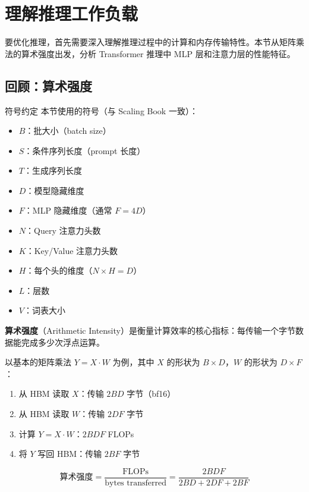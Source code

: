 \documentclass[a4paper]{article}
\begin{document}

\section{理解推理工作负载}

要优化推理，首先需要深入理解推理过程中的计算和内存传输特性。本节从矩阵乘法的算术强度出发，分析 Transformer 推理中 MLP 层和注意力层的性能特征。

\subsection{回顾：算术强度}

\begin{knowledgebox}{符号约定}
本节使用的符号（与 Scaling Book 一致）：
\begin{itemize}
    \item $B$：批大小（batch size）
    \item $S$：条件序列长度（prompt 长度）
    \item $T$：生成序列长度
    \item $D$：模型隐藏维度
    \item $F$：MLP 隐藏维度（通常 $F = 4D$）
    \item $N$：Query 注意力头数
    \item $K$：Key/Value 注意力头数
    \item $H$：每个头的维度（$N \times H = D$）
    \item $L$：层数
    \item $V$：词表大小
\end{itemize}
\end{knowledgebox}

\textbf{算术强度}（Arithmetic Intensity）是衡量计算效率的核心指标：每传输一个字节数据能完成多少次浮点运算。

以基本的矩阵乘法 $Y = X \cdot W$ 为例，其中 $X$ 的形状为 $B \times D$，$W$ 的形状为 $D \times F$：

\begin{enumerate}
    \item 从 HBM 读取 $X$：传输 $2BD$ 字节（bf16）
    \item 从 HBM 读取 $W$：传输 $2DF$ 字节
    \item 计算 $Y = X \cdot W$：$2BDF$ FLOPs
    \item 将 $Y$ 写回 HBM：传输 $2BF$ 字节
\end{enumerate}

$$\text{算术强度} = \frac{\text{FLOPs}}{\text{bytes transferred}} = \frac{2BDF}{2BD + 2DF + 2BF}$$
\end{document}
